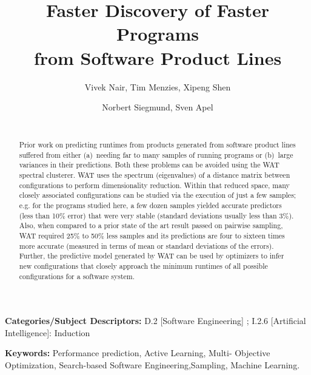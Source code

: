 \documentclass{sig-alternative}
\begin{document}
\title{Faster Discovery  of Faster Programs \\from Software Product Lines} 
\author{
        \alignauthor Vivek Nair, Tim Menzies, Xipeng Shen 
    \and  
        \alignauthor Norbert Siegmund, Sven Apel \\
        \\
       }

\maketitle 
\thispagestyle{plain}
\pagestyle{plain}
\begin{abstract}
Prior work on predicting runtimes from products generated from
software product lines suffered from either (a)~needing far to many samples
of running programs or (b)~large variances in their predictions.
Both these problems can be avoided using the WAT
spectral clusterer. 
WAT  uses the spectrum (eigenvalues) of a distance matrix
between configurations to perform dimensionality reduction. Within that
reduced space, many closely associated configurations can be studied
via the execution of just a few samples; e.g. for the programs studied
here, a few dozen samples yielded accurate predictors (less than 10\% error)
that were very stable (standard deviations usually less than 3\%).  
Also, when compared to a prior state of the art result passed on
pairwise sampling, WAT
 required  
25\% to 50\% less samples 
and its predictions are   four to sixteen times more accurate (measured in terms of mean or
standard deviations  of the errors).  Further, the predictive model generated by
WAT can be used by optimizers to infer new configurations that closely
approach the minimum runtimes of all possible configurations for a software system.
\end{abstract}

\vspace{1mm}
\noindent
{\bf Categories/Subject Descriptors:} 
D.2 [Software Engineering] ;
I.2.6 [Artificial Intelligence]: Induction

 
\vspace{1mm}
\noindent

{\bf Keywords:} Performance prediction, Active Learning, 
Multi- Objective Optimization,
Search-based Software Engineering,Sampling, Machine Learning.
\end{document}
